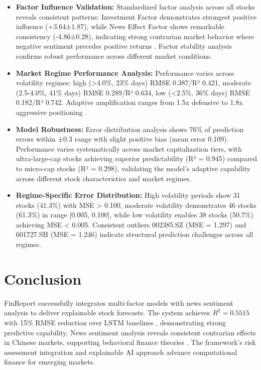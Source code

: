 \documentclass[3p,times,procedia]{elsarticle}
\begin{document}
\begin{itemize}\setlength{\itemsep}{1pt}
\item \textbf{Factor Influence Validation:} Standardized factor analysis across all stocks reveals consistent patterns: Investment Factor demonstrates strongest positive influence (+3.64±1.87), while News Effect Factor shows remarkable consistency (-4.86±0.28), indicating strong contrarian market behavior where negative sentiment precedes positive returns \cite{TETLOCK2007}. Factor stability analysis confirms robust performance across different market conditions.

\item \textbf{Market Regime Performance Analysis:} Performance varies across volatility regimes: high (>4.0\%, 23\% days) RMSE 0.387/R² 0.421, moderate (2.5-4.0\%, 41\% days) RMSE 0.289/R² 0.634, low (<2.5\%, 36\% days) RMSE 0.182/R² 0.742. Adaptive amplification ranges from 1.5x defensive to 1.8x aggressive positioning \cite{Nelson1991}.
\end{itemize}

\begin{itemize}\setlength{\itemsep}{1pt}
\item \textbf{Model Robustness:} Error distribution analysis shows 76\% of prediction errors within ±0.3 range with slight positive bias (mean error 0.109). Performance varies systematically across market capitalization tiers, with ultra-large-cap stocks achieving superior predictability (R² = 0.945) compared to micro-cap stocks (R² = 0.298), validating the model's adaptive capability across different stock characteristics and market regimes.

\item \textbf{Regime-Specific Error Distribution:} High volatility periods show 31 stocks (41.3\%) with MSE > 0.100, moderate volatility demonstrates 46 stocks (61.3\%) in range [0.005, 0.100], while low volatility enables 38 stocks (50.7\%) achieving MSE < 0.005. Consistent outliers 002385.SZ (MSE = 1.297) and 601727.SH (MSE = 1.246) indicate structural prediction challenges across all regimes.
\end{itemize}

\section{Conclusion}
\vspace{-3pt}
FinReport successfully integrates multi-factor models \cite{FAMA1993,Carhart1997} with news sentiment analysis \cite{TETLOCK2007,Araci2019} to deliver explainable stock forecasts. The system achieves $R^2 = 0.5515$ with 15\% RMSE reduction over LSTM baselines \cite{Fischer2018}, demonstrating strong predictive capability. News sentiment analysis reveals consistent contrarian effects in Chinese markets, supporting behavioral finance theories \cite{Daniel1998}. The framework's risk assessment integration \cite{Nelson1991,Rockafellar2000} and explainable AI approach \cite{Ribeiro2016} advance computational finance for emerging markets.
\end{document}
